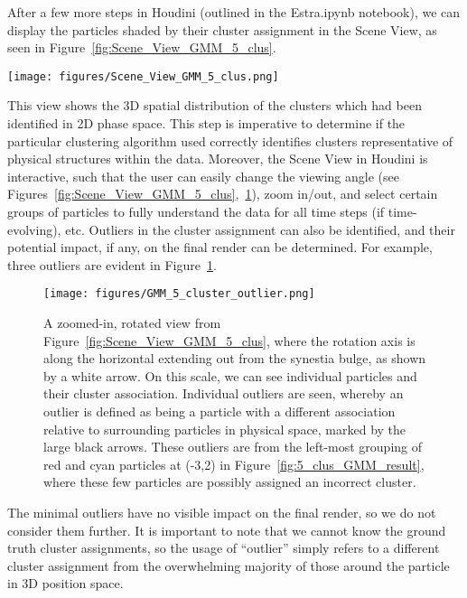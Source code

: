 \documentclass[fleqn,usenatbib,useAMS]{mnras}
\begin{document}
After a few more steps in Houdini (outlined in the Estra.ipynb notebook), we can display the particles shaded by their cluster assignment in the Scene View, as seen in Figure~\ref{fig:Scene_View_GMM_5_clus}.
%
\begin{figure*}
\centering
\texttt{[image: figures/Scene\_View\_GMM\_5\_clus.png]}
\caption{Scene View of the synestia dataset, colored by its clustering ID results from the 5-cluster GMM result of Figure~\ref{fig:5_clus_GMM_result}. Thus, the color corresponding to each particle in 2D phase space can be seen in 3D position space in the Houdini software. The white arrow marks the rotation axis.}
\label{fig:Scene_View_GMM_5_clus}
\end{figure*}
%
This view shows the 3D spatial distribution of the clusters which had been identified in 2D phase space. This step is imperative to determine if the particular clustering algorithm used correctly identifies clusters representative of physical structures within the data. Moreover, the Scene View in Houdini is interactive, such that the user can easily change the viewing angle (see Figures~\ref{fig:Scene_View_GMM_5_clus},~\ref{fig:GMM_5_cluster_outlier}), zoom in/out, and select certain groups of particles to fully understand the data for all time steps (if time-evolving), etc. Outliers in the cluster assignment can also be identified, and their potential impact, if any, on the final render can be determined. For example, three outliers are evident in Figure~\ref{fig:GMM_5_cluster_outlier}. 
%
\begin{figure}
\centering
\texttt{[image: figures/GMM\_5\_cluster\_outlier.png]}
\caption{A zoomed-in, rotated view from Figure~\ref{fig:Scene_View_GMM_5_clus}, where the rotation axis is along the horizontal extending out from the synestia bulge, as shown by a white arrow. On this scale, we can see individual particles and their cluster association. Individual outliers are seen, whereby an outlier is defined as being a particle with a different association relative to surrounding particles in physical space, marked by the large black arrows. These outliers are from the left-most grouping of red and cyan particles at (-3,2) in Figure~\ref{fig:5_clus_GMM_result}, where these few particles are possibly assigned an incorrect cluster.}
\label{fig:GMM_5_cluster_outlier}
\end{figure}
%
The minimal outliers have no visible impact on the final render, so we do not consider them further. It is important to note that we cannot know the ground truth cluster assignments, so the usage of ``outlier'' simply refers to a different cluster assignment from the overwhelming majority of those around the particle in 3D position space. \par
\end{document}
